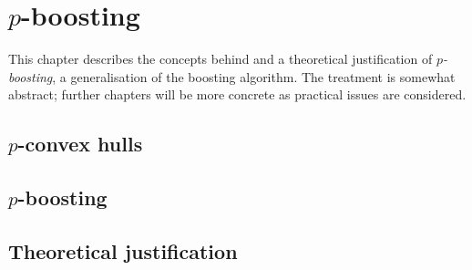 
\chapter{$p$-boosting}

This chapter describes the concepts behind and a theoretical
justification of \emph{$p$-boosting}, a generalisation of the boosting
algorithm.  The treatment is somewhat abstract; further chapters will
be more concrete as practical issues are considered.

\section{$p$-convex hulls}

\section{$p$-boosting}

\section{Theoretical justification}


